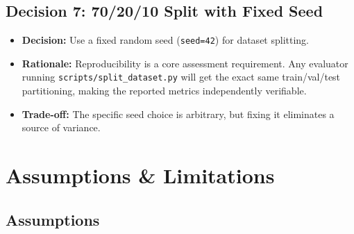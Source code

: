 \documentclass[12pt, a4paper, twoside]{report}
\begin{document}
\section{Decision 7: 70/20/10 Split with Fixed Seed}
\begin{itemize}
    \item \textbf{Decision:} Use a fixed random seed (\texttt{seed=42}) for dataset splitting.
    \item \textbf{Rationale:} Reproducibility is a core assessment requirement. Any evaluator running \texttt{scripts/split\_dataset.py} will get the exact same train/val/test partitioning, making the reported metrics independently verifiable.
    \item \textbf{Trade-off:} The specific seed choice is arbitrary, but fixing it eliminates a source of variance.
\end{itemize}


\chapter{Assumptions \& Limitations}
\label{ch:limitations}

\section{Assumptions}
\end{document}
